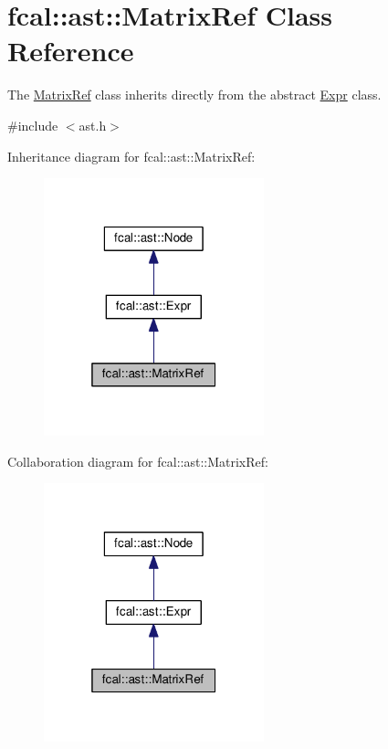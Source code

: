 \hypertarget{classfcal_1_1ast_1_1MatrixRef}{}\section{fcal\+:\+:ast\+:\+:Matrix\+Ref Class Reference}
\label{classfcal_1_1ast_1_1MatrixRef}


The \hyperlink{classfcal_1_1ast_1_1MatrixRef}{Matrix\+Ref} class inherits directly from the abstract \hyperlink{classfcal_1_1ast_1_1Expr}{Expr} class.  




{\ttfamily \#include $<$ast.\+h$>$}



Inheritance diagram for fcal\+:\+:ast\+:\+:Matrix\+Ref\+:\nopagebreak
\begin{figure}[H]
\begin{center}
\leavevmode
\includegraphics[width=181pt]{classfcal_1_1ast_1_1MatrixRef__inherit__graph}
\end{center}
\end{figure}


Collaboration diagram for fcal\+:\+:ast\+:\+:Matrix\+Ref\+:\nopagebreak
\begin{figure}[H]
\begin{center}
\leavevmode
\includegraphics[width=181pt]{classfcal_1_1ast_1_1MatrixRef__coll__graph}
\end{center}
\end{figure}
